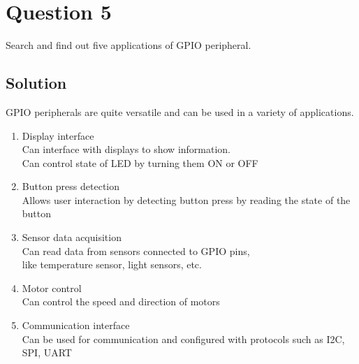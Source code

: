 \section*{Question 5}

Search and find out five applications of GPIO peripheral.

\subsection*{Solution}

GPIO peripherals are quite versatile and can be used in a variety of applications.

\begin{enumerate}
    \item Display interface\\
          Can interface with displays to show information.\\
          Can control state of LED by turning them ON or OFF

    \item Button press detection\\
          Allows user interaction by detecting button press by reading the state of the button

    \item Sensor data acquisition\\
          Can read data from sensors connected to GPIO pins,\\
          like temperature sensor, light sensors, etc.

    \item Motor control\\
          Can control the speed and direction of motors

    \item Communication interface\\
          Can be used for communication and configured with protocols such as I2C, SPI, UART

\end{enumerate}
